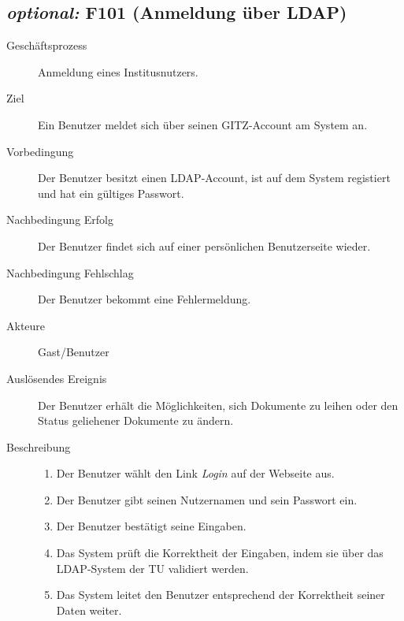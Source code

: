 \subsection{\emph{optional:} F101 (Anmeldung über LDAP)}
\label{F:AnmeldungAFS}
\begin{description}
  \item[Geschäftsprozess]Anmeldung eines Institusnutzers.
  \item[Ziel]Ein Benutzer meldet sich über seinen \gls{GITZ}-Account am System an.
  \item[Vorbedingung]Der Benutzer besitzt einen \gls{LDAP}-Account, ist auf dem System registiert und hat ein gültiges Passwort.
  \item[Nachbedingung Erfolg]Der Benutzer findet sich auf einer persönlichen Benutzerseite wieder.
  \item[Nachbedingung Fehlschlag]Der Benutzer bekommt eine Fehlermeldung.
  \item[Akteure]Gast/Benutzer
  \item[Auslösendes Ereignis]Der Benutzer erhält die Möglichkeiten, sich Dokumente zu leihen oder den Status geliehener Dokumente zu ändern.
  \item[Beschreibung]\hfill
    \begin{enumerate}
      \item Der Benutzer wählt den Link \emph{Login} auf der Webseite aus.
      \item Der Benutzer gibt seinen Nutzernamen und sein Passwort ein.
      \item Der Benutzer bestätigt seine Eingaben.
      \item Das System prüft die Korrektheit der Eingaben, indem sie über das \gls{LDAP}-System der TU validiert werden.
      \item Das System leitet den Benutzer entsprechend der Korrektheit seiner Daten weiter.
    \end{enumerate}
\end{description}


